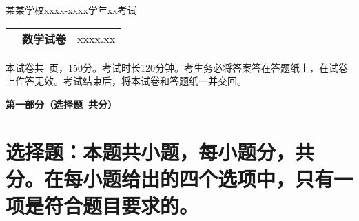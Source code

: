 \documentclass[12pt, a4paper]{article}
\def\mycenter#1{\begin{center} \bf \sffamily \large #1 \end{center}}
\begin{document}
\begin{center}
    \large 某某学校xxxx-xxxx学年xx考试 \\
    \begin{tabular}{@{}p{} c p{}@{}}
        & \Large \bf \sffamily 数学试卷 & \hfill \small xxxx.xx
    \end{tabular}
\end{center}

本试卷共\pageref{LastPage}\ 页，150分。考试时长120分钟。考生务必将答案答在答题纸上，在试卷上作答无效。考试结束后，将本试卷和答题纸一并交回。

\mycenter{第一部分（选择题\ 共\textmd{}分）}

\section{选择题：本题共\textmd{}小题，每小题\textmd{}分，共\textmd{}分。在每小题给出的四个选项中，只有一项是符合题目要求的。}
\end{document}
